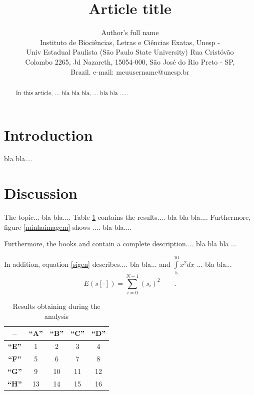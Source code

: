 \documentclass[a4paper,times,12pt]{article}
\begin{document}
\title{Article title}
\author{Author's full name \\ Instituto de Bioci\^{e}ncias, Letras e Ci\^{e}ncias Exatas, Unesp - \\ Univ Estadual Paulista (S\~{a}o Paulo State University) Rua Crist\'{o}v\~{a}o \\ Colombo 2265, Jd Nazareth, 15054-000, S\~{a}o Jos\'{e} do Rio Preto - SP, \\ Brazil. \quad e-mail: meuusername@unesp.br}
\maketitle
\begin{abstract}
In this article, ... bla bla bla, ... bla bla ..... 
\end{abstract}
\section{Introduction}
\hspace*{+15pt} bla bla.... 
\section{Discussion}
\hspace*{+15pt} The topic... bla bla.... Table \ref{tabresult} contains the results.... bla bla bla.... Furthermore, figure \ref{minhaimagem} shows .... bla bla....
\\
\par Furthermore, the books \cite{livro_de_c} and \cite{livro_de_processamento_de_sinais} contain a complete description....  bla bla bla ... 
\\
\par In addition, equation \ref{sigen} describes.... bla bla... and $\int\limits_{5}^{10}x^{2} dx$ ... bla bla...
\begin{equation}
E(s[\cdot]) = \sum\limits_{i=0}^{N-1} {(s_i)}^2 \qquad . 
\label{sigen}
\end{equation}

\begin{table}[H]
\centering
\caption{Results obtaining during the analysis}
\begin{tabular}{|c|||c|c|c|c|}
\hline
\textbf{--}&\textbf{``A''}&\textbf{``B''}&\textbf{``C''}&\textbf{``D''}\\
\hline
\hline
\hline
\textbf{``E''}&1&2&3&4\\
\hline
\textbf{``F''}&5&6&7&8\\
\hline
\textbf{``G''}&9&10&11&12\\
\hline
\textbf{``H''}&13&14&15&16\\
\hline
\end{tabular}
\label{tabresult}
\end{table}
\end{document}
